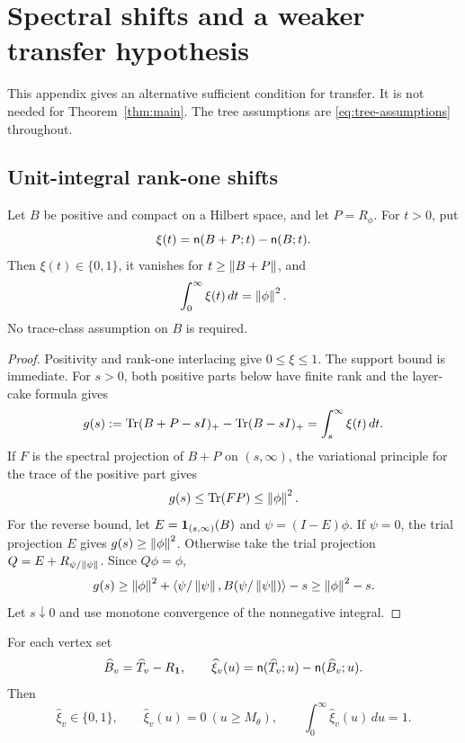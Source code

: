 \section{Spectral shifts and a weaker transfer hypothesis}\label{sec:profiles}
This appendix gives an alternative sufficient condition for transfer.
It is not needed for Theorem~\ref{thm:main}. The tree assumptions are
\eqref{eq:tree-assumptions} throughout.

\subsection{Unit-integral rank-one shifts}
\begin{lemma}\label{lem:rankone-shift}
Let $B$ be positive and compact on a Hilbert space, and let $P=R_\phi$.
For $t>0$, put
\[
 \xi(t)=\mathsf n(B+P;t)-\mathsf n(B;t).
\]
Then $\xi(t)\in\{0,1\}$, it vanishes for $t\ge\left\lVert B+P\right\rVert$, and
\begin{equation}\label{eq:shift-integral}
 \int_0^\infty\xi(t)\,dt=\left\lVert \phi\right\rVert^2.
\end{equation}
No trace-class assumption on $B$ is required.
\end{lemma}
\begin{proof}
Positivity and rank-one interlacing give $0\le\xi\le1$. The support bound
is immediate. For $s>0$, both positive parts below have finite rank and
the layer-cake formula gives
\[
 g(s):=\operatorname{Tr}(B+P-sI)_+-\operatorname{Tr}(B-sI)_+
      =\int_s^\infty\xi(t)\,dt.
\]
If $F$ is the spectral projection of $B+P$ on $(s,\infty)$, the
variational principle for the trace of the positive part gives
\[
 g(s)\le\operatorname{Tr}(FP)\le\left\lVert \phi\right\rVert^2.
\]
For the reverse bound, let $E=\mathbf 1_{(s,\infty)}(B)$ and
$\psi=(I-E)\phi$. If $\psi=0$, the trial projection $E$ gives
$g(s)\ge\left\lVert \phi\right\rVert^2$. Otherwise take the trial projection
$Q=E+R_{\psi/\left\lVert \psi\right\rVert}$. Since $Q\phi=\phi$,
\[
 g(s)\ge\left\lVert \phi\right\rVert^2+
    \left\langle \psi/\left\lVert \psi\right\rVert,B(\psi/\left\lVert \psi\right\rVert)\right\rangle-s
 \ge\left\lVert \phi\right\rVert^2-s.
\]
Let $s\downarrow0$ and use monotone convergence of the nonnegative
integral.
\end{proof}

For each vertex set
\[
 \widehat B_v=\widehat T_v-R_{\mathbf 1},\qquad
 \widehat\xi_v(u)=
   \mathsf n(\widehat T_v;u)-\mathsf n(\widehat B_v;u).
\]
Then
\begin{equation}\label{eq:profile-facts}
 \widehat\xi_v\in\{0,1\},\qquad
 \widehat\xi_v(u)=0\ (u\ge M_\theta),\qquad
 \int_0^\infty\widehat\xi_v(u)\,du=1.
\end{equation}

